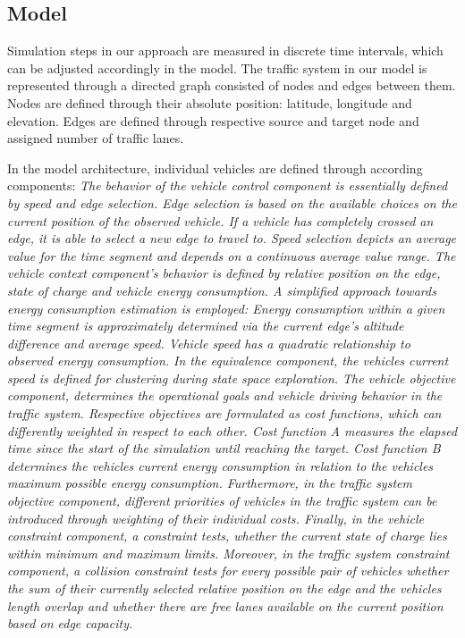 \documentclass[conference]{../cls/IEEEtran}
\begin{document}
\subsection{Model}

Simulation steps in our approach are measured in discrete time
intervals, which can be adjusted accordingly in the model.
The traffic system in our model is represented through a directed graph
consisted of nodes and edges between them. Nodes are defined through their absolute position:
latitude, longitude and elevation. Edges are defined through respective source
and target node and assigned number of traffic lanes.

In the model architecture, individual vehicles are defined through according
components: \textit{The behavior of the vehicle control component is essentially
defined by speed and edge selection. Edge selection is based on the available choices on the current position of the observed vehicle. If a vehicle has
completely crossed an edge, it is able to select a new edge to travel to. Speed
selection depicts an average value for the time segment and depends on a
continuous average value range. The vehicle context component's behavior is defined by
relative position on the edge, state of charge and vehicle energy consumption. A
simplified approach towards energy consumption estimation is employed: Energy consumption within a given time
segment is approximately determined via the current edge's altitude difference 
and average speed. Vehicle speed has a quadratic relationship to observed
energy consumption. In the equivalence component, the vehicles current speed is defined
for clustering during state space exploration. The vehicle objective component,
determines the operational goals and vehicle driving behavior in the traffic
system. Respective objectives are formulated as cost functions, which can
differently weighted in respect to each other. Cost function A measures the
elapsed time since the start of the simulation until reaching the target. Cost function B determines the vehicles current
energy consumption in relation to the vehicles maximum possible energy consumption.
Furthermore, in the traffic system objective component, different priorities of
vehicles in the traffic system can be introduced through weighting of their individual costs.
Finally, in the vehicle constraint component, a constraint tests, whether the
current state of charge lies within minimum and maximum limits. Moreover, in the
traffic system constraint component, a collision constraint tests for every possible
pair of vehicles whether the sum of their currently selected relative position
on the edge and the vehicles length overlap and whether there are free lanes
available on the current position based on edge capacity.}
\end{document}
